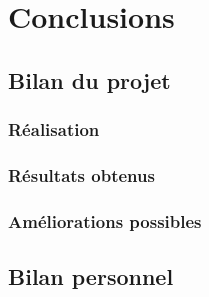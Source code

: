 \chapter{Conclusions}
\section{Bilan du projet}
\subsection{Réalisation}
\subsection{Résultats obtenus}
\subsection{Améliorations possibles}
\section{Bilan personnel}



